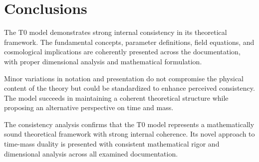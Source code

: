 \documentclass[a4paper,11pt]{article}
\begin{document}
	\section{Conclusions}
	
	The T0 model demonstrates strong internal consistency in its theoretical framework. The fundamental concepts, parameter definitions, field equations, and cosmological implications are coherently presented across the documentation, with proper dimensional analysis and mathematical formulation.
	
	Minor variations in notation and presentation do not compromise the physical content of the theory but could be standardized to enhance perceived consistency. The model succeeds in maintaining a coherent theoretical structure while proposing an alternative perspective on time and mass.
	
	The consistency analysis confirms that the T0 model represents a mathematically sound theoretical framework with strong internal coherence. Its novel approach to time-mass duality is presented with consistent mathematical rigor and dimensional analysis across all examined documentation.
	
\end{document}
